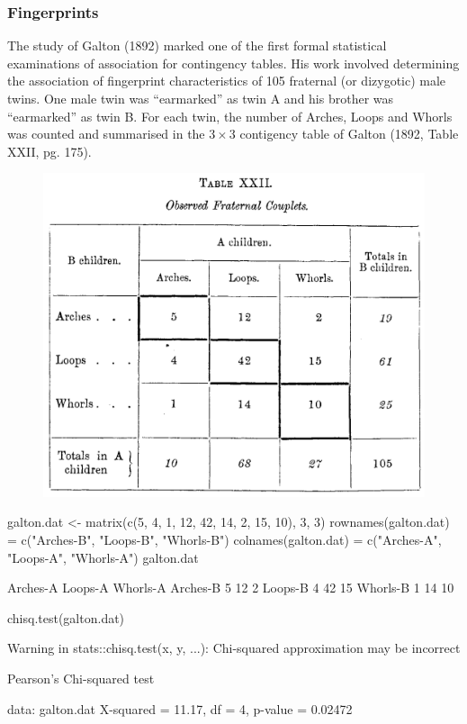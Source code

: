 \documentclass[a4paper]{article}\usepackage[]{graphicx}\usepackage[]{xcolor}
\begin{document}
\subsubsection{Fingerprints}
The study of Galton (1892) marked one of the first formal statistical examinations of association for contingency tables. His work involved determining the association of fingerprint characteristics of 105 fraternal (or dizygotic) male twins. One male twin was ``earmarked'' as twin A and his brother was ``earmarked'' as twin B. For each twin, the number of Arches, Loops and Whorls was counted and summarised in the \( 3 \times 3 \) contigency table of Galton (1892, Table XXII, pg. 175).
\begin{figure}[H]
	\centering
	\includegraphics[scale=0.5]{fingerprints}
\end{figure}
\begin{Schunk}
\begin{Sinput}
galton.dat <- matrix(c(5, 4, 1, 12, 42, 14, 2, 15, 10), 3, 3)
rownames(galton.dat) = c("Arches-B", "Loops-B", "Whorls-B")
colnames(galton.dat) = c("Arches-A", "Loops-A", "Whorls-A")
galton.dat
\end{Sinput}
\begin{Soutput}
         Arches-A Loops-A Whorls-A
Arches-B        5      12        2
Loops-B         4      42       15
Whorls-B        1      14       10
\end{Soutput}
\begin{Sinput}
chisq.test(galton.dat)
\end{Sinput}
\begin{Soutput}
Warning in stats::chisq.test(x, y, ...): Chi-squared approximation may be incorrect
\end{Soutput}
\begin{Soutput}

	Pearson's Chi-squared test

data:  galton.dat
X-squared = 11.17, df = 4, p-value = 0.02472
\end{Soutput}
\end{Schunk}
\end{document}
